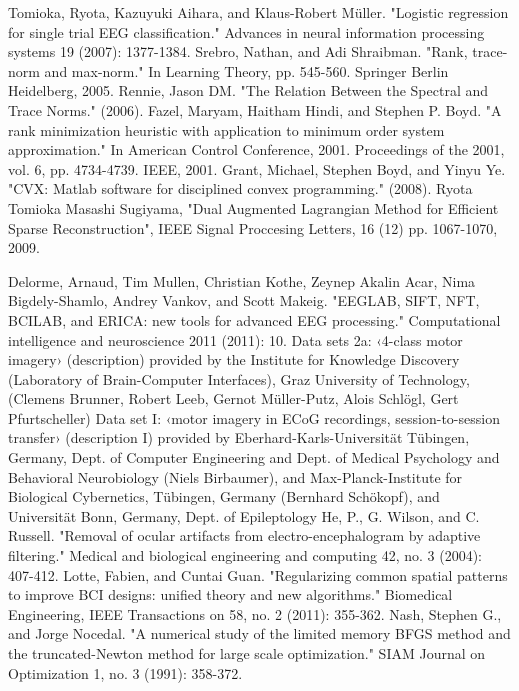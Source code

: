 \begin{thebibliography}{99}
 Tomioka, Ryota, Kazuyuki Aihara, and Klaus-Robert Müller. "Logistic regression for single trial EEG 
classification." Advances in neural information processing systems 19 (2007): 1377-1384.
Srebro, Nathan, and Adi Shraibman. "Rank, trace-norm and max-norm." In Learning Theory, pp. 545-560. 
Springer Berlin Heidelberg, 2005.
Rennie, Jason DM. "The Relation Between the Spectral and Trace Norms." (2006).
Fazel, Maryam, Haitham Hindi, and Stephen P. Boyd. "A rank minimization heuristic with application to 
minimum order system approximation." In American Control Conference, 2001. Proceedings of the 2001, vol. 6, pp. 
4734-4739. IEEE, 2001.
Grant, Michael, Stephen Boyd, and Yinyu Ye. "CVX: Matlab software for disciplined convex programming." 
(2008).
Ryota Tomioka  Masashi Sugiyama, "Dual Augmented Lagrangian Method for Efficient Sparse 
Reconstruction", IEEE Signal Proccesing Letters, 16 (12) pp. 1067-1070, 2009.


Delorme, Arnaud, Tim Mullen, Christian Kothe, Zeynep Akalin Acar, Nima Bigdely-Shamlo, Andrey Vankov, and Scott Makeig. "EEGLAB, SIFT, NFT, BCILAB, and ERICA: new tools for advanced EEG processing." Computational intelligence and neuroscience 2011 (2011): 10.
	Data sets 2a: ‹4-class motor imagery› (description)
provided by the Institute for Knowledge Discovery (Laboratory of Brain-Computer Interfaces), Graz University of Technology, (Clemens Brunner, Robert Leeb, Gernot Müller-Putz, Alois Schlögl, Gert Pfurtscheller)
 Data set I: ‹motor imagery in ECoG recordings, session-to-session transfer› (description I) provided by Eberhard-Karls-Universität Tübingen, Germany, Dept. of Computer Engineering and Dept. of Medical Psychology and Behavioral Neurobiology (Niels Birbaumer), and Max-Planck-Institute for Biological Cybernetics, Tübingen, Germany (Bernhard Schökopf), and Universität Bonn, Germany, Dept. of Epileptology 
  He, P., G. Wilson, and C. Russell. "Removal of ocular artifacts from electro-encephalogram by adaptive filtering." Medical and biological engineering and computing 42, no. 3 (2004): 407-412.
 Lotte, Fabien, and Cuntai Guan. "Regularizing common spatial patterns to improve BCI designs: unified theory and new algorithms." Biomedical Engineering, IEEE Transactions on 58, no. 2 (2011): 355-362.
Nash, Stephen G., and Jorge Nocedal. "A numerical study of the limited memory BFGS method and the truncated-Newton method for large scale optimization." SIAM Journal on Optimization 1, no. 3 (1991): 358-372.
\end{thebibliography}



